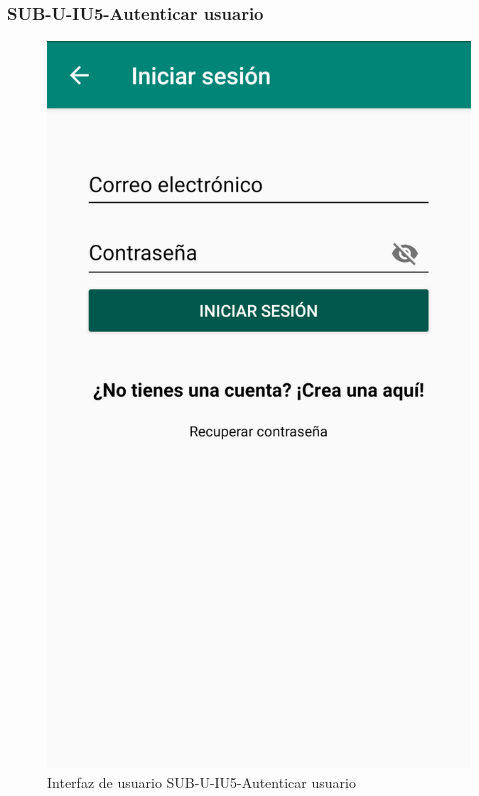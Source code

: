 \subsubsection{SUB-U-IU5-Autenticar usuario}\label{SUB-U-IU5}
\begin{figure}[H]
	\centering
	\includegraphics[scale=.28]{Capitulo4/software/submodulos/usuarios/images/sub-u-iu5}
	\caption{Interfaz de usuario SUB-U-IU5-Autenticar usuario}
	\label{fig:sub-u-iu5}
\end{figure}